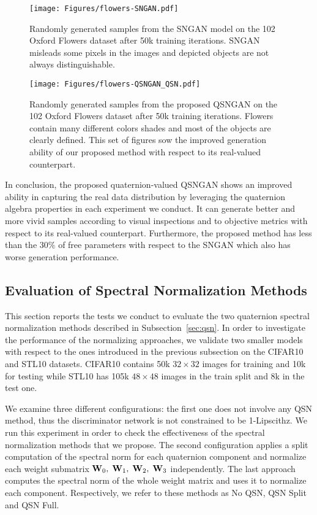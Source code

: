 \documentclass[graybox]{svmult}
\begin{document}
\begin{figure}[t]
    \centering
    \texttt{[image: Figures/flowers-SNGAN.pdf]}
    \caption{Randomly generated samples from the SNGAN model on the 102 Oxford Flowers dataset after 50k training iterations. SNGAN misleads some pixels in the images and depicted objects are not always distinguishable.}
    \label{fig:res_flowers}
\end{figure}

\begin{figure}[t]
    \centering
    \texttt{[image: Figures/flowers-QSNGAN\_QSN.pdf]}
    \caption{Randomly generated samples from the proposed QSNGAN on the 102 Oxford Flowers dataset after 50k training iterations. Flowers contain many different colors shades and most of the objects are clearly defined. This set of figures sow the improved generation ability of our proposed method with respect to its real-valued counterpart.}
    \label{fig:Qres_flowers}
\end{figure}

In conclusion, the proposed quaternion-valued QSNGAN shows an improved ability in capturing the real data distribution by leveraging the quaternion algebra properties in each experiment we conduct. It can generate better and more vivid samples according to visual inspections and to objective metrics with respect to its real-valued counterpart. Furthermore, the proposed method has less than the $30\%$ of free parameters with respect to the SNGAN which also has worse generation performance.






\subsection{Evaluation of Spectral Normalization Methods}
\noindent This section reports the tests we conduct to evaluate the two quaternion spectral normalization methods described in Subsection~\ref{sec:qsn}. In order to investigate the performance of the normalizing approaches, we validate two smaller models with respect to the ones introduced in the previous subsection on the CIFAR10 and STL10 datasets. CIFAR10 contains 50k $32 \times 32$ images for training and 10k for testing while STL10 has 105k $48 \times 48$ images in the train split and 8k in the test one.

We examine three different configurations: the first one does not involve any QSN method, thus the discriminator network is not constrained to be 1-Lipscithz. We run this experiment in order to check the effectiveness of the spectral normalization methods that we propose. The second configuration applies a split computation of the spectral norm for each quaternion component and normalize each weight submatrix ${\mathbf W}_0, \; {\mathbf W}_1, \; {\mathbf W}_2, \; {\mathbf W}_3$ independently. The last approach computes the spectral norm of the whole weight matrix and uses it to normalize each component. Respectively, we refer to these methods as No QSN, QSN Split and QSN Full.
\end{document}
